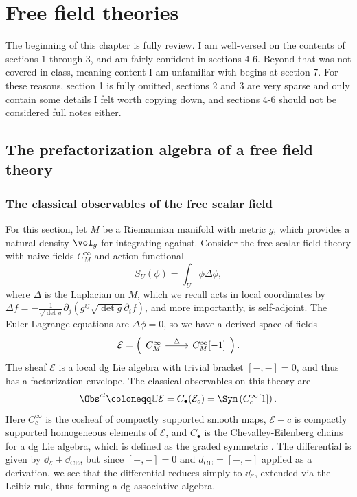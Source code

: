 \chapter{Free field theories}

The beginning of this chapter is fully review. I am well-versed on the contents of sections 1 through 3, and am fairly confident in sections 4-6. Beyond that was not covered in class, meaning content I am unfamiliar with begins at section 7. For these reasons, section 1 is fully omitted, sections 2 and 3 are very sparse and only contain some details I felt worth copying down, and sections 4-6 should not be considered full notes either.


\section{The prefactorization algebra of a free field theory}

\subsection{The classical observables of the free scalar field}

For this section, let $M$ be a Riemannian manifold with metric $g$, which provides a natural density $\vol_{g} $ for integrating against. Consider the free scalar field theory with naive fields $C^\infty _M$ and action functional
\[
	S_U(\phi )=\int_{U} \phi \Delta \phi ,
\]
where $\Delta $ is the Laplacian on $M$, which we recall acts in local coordinates by $\Delta f=-\frac{1}{\sqrt{\det g} } \partial _j\left( g^{ij} \sqrt{\det g} \partial _if \right) $, and more importantly, is self-adjoint. The Euler-Lagrange equations are $\Delta \phi =0$, so we have a derived space of fields
\[
	\mathcal{E} =\left( 
		\begin{tikzcd}
			C^\infty _M\ar[" \Delta  ", r] &{C^\infty _M[-1]}
		\end{tikzcd}
	\right) 
.\]
The sheaf $\mathcal{E} $ is a local dg Lie algebra with trivial bracket $[-,-]=0$, and thus has a factorization envelope. The classical observables on this theory are
\[
	\Obs^{cl} \coloneqq \mathbb{U} \mathcal{E} =C_{\bullet} (\mathcal{E} _c)= \Sym \left( C^\infty _c[1] \right) 
.\]
Here $C^\infty _c$ is the cosheaf of compactly supported smooth maps, $\mathcal{E} +c$ is compactly supported homogeneous elements of $\mathcal{E} $, and $C_{\bullet} $ is the Chevalley-Eilenberg chains for a dg Lie algebra, which is defined as the graded symmetric . The differential is given by $\dd _{\mathcal{E} } +\dd _{\mathrm{CE} } $, but since $[-,-]=0$ and $d_{\mathrm{CE} } =[-,-]$ applied as a derivation, we see that the differential reduces simply to $\dd _{\mathcal{E} } $, extended via the Leibiz rule, thus forming a dg associative algebra.


